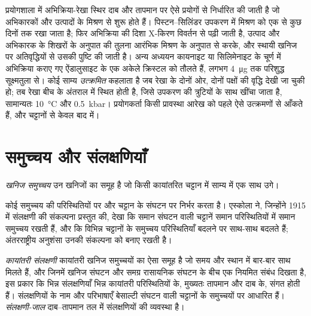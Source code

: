 \begin{inthelab}[अभिक्रिया का उत्क्रमण]
प्रयोगशाला में अभिक्रिया-रेखा स्थिर दाब और
तापमान पर ऐसे प्रयोगों से निर्धारित की जाती है जो अभिकारकों और उत्पादों के मिश्रण से शुरू होते हैं। पिस्टन--सिलिंडर
उपकरण में मिश्रण को एक से कुछ दिनों तक रखा जाता है; फिर अभिक्रिया की दिशा
X-किरण विवर्तन से पढ़ी जाती है, उत्पाद और अभिकारक के शिखरों के अनुपात की तुलना
आरंभिक मिश्रण के अनुपात से करके, और स्थायी खनिज पर अतिवृद्धियों से उसकी पुष्टि की जाती है। अन्य
अध्ययन कायनाइट या सिलिमेनाइट के चूर्ण में अभिक्रिया कराए गए ऐंडालुसाइट के एक अकेले क्रिस्टल को तौलते हैं,
लगभग \qty{4}{\micro g} तक परिशुद्ध सूक्ष्मतुला से। कोई साम्य
\emph{उत्क्रमित} कहलाता है जब रेखा के दोनों ओर, दोनों पक्षों की वृद्धि देखी जा चुकी हो;
तब रेखा बीच के अंतराल में स्थित होती है, जिसे उपकरण की त्रुटियों के साथ खींचा जाता है,
सामान्यतः \qty{10}{\celsius} और \qty{0.5}{kbar}। प्रयोगकर्ता किसी प्रावस्था आरेख को पहले
ऐसे उत्क्रमणों से आँकते हैं, और चट्टानों से केवल बाद में।
\end{inthelab}

\section{समुच्चय और संलक्षणियाँ}\label{sec:b2:metamorphic-facies:facies}

\begin{definition}[खनिज समुच्चय]\label{def:b2:metamorphic-facies:assemblage}
\emph{खनिज समुच्चय} उन खनिजों का समूह है जो किसी कायांतरित चट्टान में
साम्य में एक साथ उगे।
\end{definition}

कोई समुच्चय  की परिस्थितियों पर और चट्टान के संघटन पर निर्भर करता है।
एस्कोला ने, जिन्होंने 1915 में संलक्षणी की संकल्पना प्रस्तुत की, देखा कि समान
संघटन वाली चट्टानें समान परिस्थितियों में समान समुच्चय रखती हैं, और कि
विभिन्न चट्टानों के समुच्चय परिस्थितियाँ बदलने पर साथ-साथ बदलते हैं;
अंतरराष्ट्रीय अनुशंसा उनकी संकल्पना को बनाए रखती है।

\begin{definition}[कायांतरी संलक्षणी; संलक्षणी-जाल]\label{def:b2:metamorphic-facies:facies}
\emph{कायांतरी संलक्षणी} कायांतरी खनिज
समुच्चयों का ऐसा समूह है जो समय और स्थान में बार-बार साथ मिलते हैं, और जिनमें
खनिज संघटन और समग्र रासायनिक संघटन के बीच एक नियमित संबंध दिखता है, इस प्रकार कि भिन्न संलक्षणियाँ
भिन्न कायांतरी परिस्थितियों के, मुख्यतः तापमान और दाब के, संगत होती हैं।
संलक्षणियों के नाम और परिभाषाएँ बेसाल्टी संघटन वाली चट्टानों के समुच्चयों पर आधारित हैं।
\emph{संलक्षणी-जाल} दाब--तापमान तल में संलक्षणियों की
व्यवस्था है।
\end{definition}

